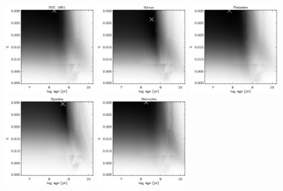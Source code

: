 \clearpage
\begin{figure}
\begin{center}
\includegraphics[width=0.3\textwidth]{figs_groups/fit_ssp_fixpij_fixalpha_ngc1901.eps}
\includegraphics[width=0.3\textwidth]{figs_groups/fit_ssp_fixpij_fixalpha_sirius.eps}
\includegraphics[width=0.3\textwidth]{figs_groups/fit_ssp_fixpij_fixalpha_pleiades.eps}\\
\includegraphics[width=0.3\textwidth]{figs_groups/fit_ssp_fixpij_fixalpha_hyades.eps}
\includegraphics[width=0.3\textwidth]{figs_groups/fit_ssp_fixpij_fixalpha_hercules.eps}

\end{center}
\end{figure}
